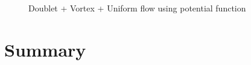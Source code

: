 \begin{figure}[h]
\begin{center}
\end{center}
\caption{Doublet + Vortex + Uniform flow using potential function}
\label{planardoubletvortexuniformflow}
\end{figure}






\section{Summary}

